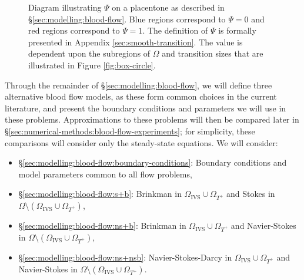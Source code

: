         \begin{figure}
            \centering
            
            \caption{Diagram illustrating $\Psi$ on a placentone as described in \S\ref{sec:modelling:blood-flow}. Blue regions correspond to $\Psi = 0$ and red regions correspond to $\Psi = 1$. The definition of $\Psi$ is formally presented in Appendix \ref{sec:smooth-transition}. The value is dependent upon the subregions of $\Omega$ and transition sizes that are illustrated in Figure \ref{fig:box-circle}.}
            \label{fig:permeability}
        \end{figure}
            
        Through the remainder of \S\ref{sec:modelling:blood-flow}, we will define three alternative blood flow models, as these form common choices in the current literature, and present the boundary conditions and parameters we will use in these problems. Approximations to these problems will then be compared later in \S\ref{sec:numerical-methods:blood-flow-experiments}; for simplicity, these comparisons will consider only the steady-state equations. We will consider:
        \begin{itemize}
            \item \S\ref{sec:modelling:blood-flow:boundary-conditions}: Boundary conditions and model parameters common to all flow problems,
            \item \S\ref{sec:modelling:blood-flow:s+b}: Brinkman in $\Omega_\text{IVS} \cup \Omega_{T^+}$ and Stokes in $\Omega \setminus (\Omega_\text{IVS} \cup \Omega_{T^+})$,
            \item \S\ref{sec:modelling:blood-flow:ns+b}: Brinkman in $\Omega_\text{IVS} \cup \Omega_{T^+}$ and Navier-Stokes in $\Omega \setminus (\Omega_\text{IVS} \cup \Omega_{T^+})$,
            \item \S\ref{sec:modelling:blood-flow:ns+nsb}: Navier-Stokes-Darcy in $\Omega_\text{IVS} \cup \Omega_{T^+}$ and Navier-Stokes in $\Omega \setminus (\Omega_\text{IVS} \cup \Omega_{T^+})$.
        \end{itemize}

